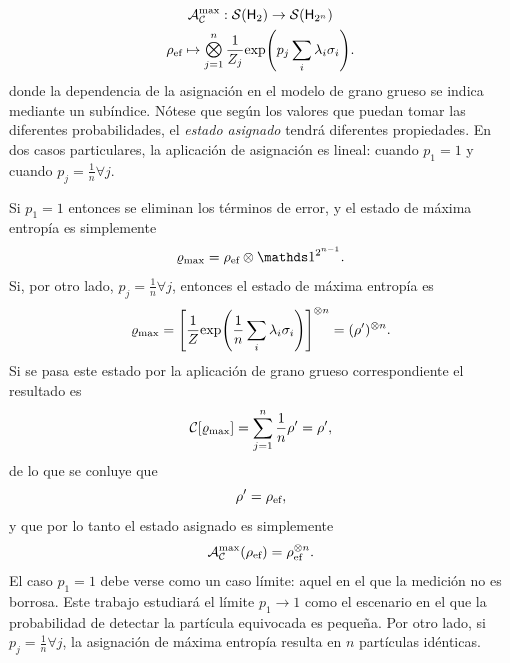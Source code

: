 \begin{gather}\label{eq:MaxEntAss}
    \mcA_{\mcC}^{\max}:\densityspace{2}\rightarrow\densityspace{2^{n}}\nonumber\\
    \rho_{\ef} \mapsto \Motimes_{j=1}^{n}\frac{1}{Z_{j}}\text{exp}\qty(p_{j}\sum_{i}\lambda_{i}\sigma_{i}).
\end{gather}
donde la dependencia de la asignación en el modelo de grano grueso se indica mediante un subíndice. Nótese que según los valores que puedan tomar las diferentes probabilidades, el \textit{estado asignado} tendrá diferentes propiedades. En dos casos particulares, la aplicación de asignación es lineal: cuando $p_{1}=1$ y cuando $p_{j}=\frac{1}{n}\forall j$.

Si $p_{1}=1$ entonces se eliminan los términos de error, y el estado de máxima entropía es simplemente
\begin{equation*}
    \varrho_{\max}=\rho_{\ef}\otimes\Id^{2^{n-1}}.
\end{equation*}
Si, por otro lado, $p_{j}=\frac{1}{n}\forall j$, entonces el estado de máxima entropía es
\begin{equation*}
    \varrho_{\max}=\qty[\frac{1}{Z}\text{exp}\qty(\frac{1}{n}\sum_{i}\lambda_{i}\sigma_{i})]^{\otimes n}=(\rho')^{\otimes n}.
\end{equation*}
Si se pasa este estado por la aplicación de grano grueso correspondiente el resultado es 
\begin{equation*}
    \mathcal{C}[\varrho_{\max}]=\sum_{j=1}^{n}\frac{1}{n}\rho'=\rho',
\end{equation*}
de  lo que se conluye que
\begin{equation*}
    \rho'=\rho_{\text{ef}},
\end{equation*}
y que por lo tanto el estado asignado es simplemente
\begin{equation*}
    \mathcal{A}_{\mathcal{C}}^{\max}(\rho_{\text{ef}})=\rho_{\text{ef}}^{\otimes n}.
\end{equation*}
El caso $p_{1}=1$ debe verse como un caso límite: aquel en el que la medición no es borrosa. Este trabajo estudiará el límite $p_{1}\rightarrow 1$ como el escenario en el que la probabilidad de detectar la partícula equivocada es pequeña. Por otro lado, si $p_{j}=\frac{1}{n}\forall j$, la asignación de máxima entropía resulta en $n$ partículas idénticas.